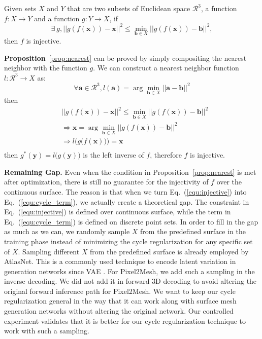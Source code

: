 \begin{m_prop}
	\label{prop:nearest}
	Given sets $X$ and $Y$ that are two subsets of Euclidean space $\mathcal{R}^3$, a function $f:X \rightarrow Y$  and a function $g:Y \rightarrow X$, if
	\begin{equation}
	\exists~g, || g(f(\mathbf{x})) - \mathbf{x} ||^2 \leq \min_{\mathbf{b} \in X}|| g(f(\mathbf{x})) - \mathbf{b} ||^2,
	\end{equation}
	then $f$ is injective.
\end{m_prop}

\textbf{Proposition}~\ref{prop:nearest} can be proved by simply compositing the nearest neighbor with the function $g$. We can construct a nearest neighbor function $l: \mathcal{R}^3 \rightarrow X $ as:
\begin{equation}
\forall \mathbf{a} \in \mathcal{R}^3, l(\mathbf{a}) = \arg\min_{\mathbf{b} \in X} || \mathbf{a} - \mathbf{b} ||^2
\end{equation}
then
\begin{equation}
\begin{aligned}
&|| g(f(\mathbf{x})) - \mathbf{x} ||^2 \leq \min_{\mathbf{b} \in X}|| g(f(\mathbf{x})) - \mathbf{b} ||^2\\
&\Rightarrow \mathbf{x} = \arg\min_{\mathbf{b} \in X}|| g(f(\mathbf{x})) - \mathbf{b} ||^2\\
&\Rightarrow l\Big(g\big(f(\mathbf{x})\big)\Big) = \mathbf{x}\\
\end{aligned}
\end{equation}
then $g^*(\mathbf{y}) = l\big(g(\mathbf{y})\big)$ is the left inverse of $f$, therefore $f$ is injective.

\noindent\textbf{Remaining Gap.}
Even when the condition in Proposition~\ref{prop:nearest} is met after optimization, there is still no guarantee for the injectivity of $f$ over the continuous surface. The reason is that when we turn Eq.~(\ref{equ:injective}) into Eq.~(\ref{equ:cycle_term}), we actually create a theoretical gap. 
The constraint in Eq.~(\ref{equ:injective}) is defined over continuous surface, while the term in  Eq.~(\ref{equ:cycle_term}) is defined on discrete point sets. In order to fill in the gap as much as we can, we randomly sample $X$ from the predefined surface in the training phase instead of minimizing the cycle regularization for any specific set of $X$. Sampling different $X$ from the predefined surface is already employed by AtlasNet. This is a commonly used technique to encode latent variation in generation networks since VAE \cite{VAE}. For Pixel2Mesh, we add such a sampling in the inverse decoding. We did not add it in forward 3D decoding to avoid altering the original forward inference path for Pixel2Mesh. We want to keep our cycle regularization general in the way that it can work along with surface mesh generation networks without altering the original network. Our controlled experiment validates that it is better for our cycle regularization technique to work with such a sampling.


